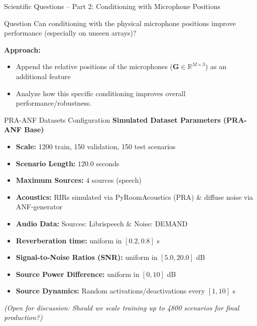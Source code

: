 \documentclass[8pt,hyperref={pdfpagelabels=true},xcolor=table,aspectratio=169]{beamer}
\begin{document}
\begin{frame}{Scientific Questions -- Part 2: Conditioning with Microphone Positions}
    \begin{block}{Question}
        Can conditioning with the physical microphone positions improve performance (especially on unseen arrays)?
    \end{block}
    \vspace{1em}
    \textbf{Approach:}
    \begin{itemize}
        \item Append the relative positions of the microphones ($\mathbf{G} \in \mathbb{R}^{M \times 3}$) as an additional feature
        \item Analyze how this specific conditioning improves overall performance/robustness.
    \end{itemize}
\end{frame}

\begin{frame}{PRA-ANF Datasets Configuration}
    \textbf{Simulated Dataset Parameters (PRA-ANF Base)}
    \begin{itemize}
        \item \textbf{Scale:} 1200 train, 150 validation, 150 test scenarios
        \item \textbf{Scenario Length:} $120.0$ seconds
        \item \textbf{Maximum Sources:} $4$ sources (speech)
        \item \textbf{Acoustics:} RIRs simulated via PyRoomAcoustics (PRA) \& diffuse noise via ANF-generator
        \item \textbf{Audio Data:} Sources: Librispeech \& Noise: DEMAND
        \item \textbf{Reverberation time:} uniform in $[0.2, 0.8]$ s
        \item \textbf{Signal-to-Noise Ratios (SNR):} uniform in $[5.0, 20.0]$ dB
        \item \textbf{Source Power Difference:} uniform in $[0, 10]$ dB
        \item \textbf{Source Dynamics:} Random activations/deactivations every $[1, 10]$ s
    \end{itemize}
    \vspace{1em}
    \textit{(Open for discussion: Should we scale training up to 4800 scenarios for final production?)}
\end{frame}
\end{document}
